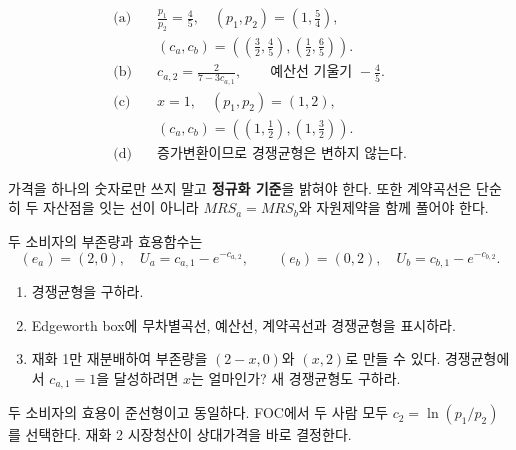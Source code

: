 \begin{answerbox}
\begin{align*}
\text{(a)}\quad &\frac{p_1}{p_2}=\frac45,\quad (p_1,p_2)=\left(1,\frac54\right),\\
&(c_a,c_b)=\left(\left(\frac32,\frac45\right),\left(\frac12,\frac65\right)\right).\\[2mm]
\text{(b)}\quad &c_{a,2}=\frac{2}{7-3c_{a,1}},\qquad \text{예산선 기울기 }-\frac45.\\[2mm]
\text{(c)}\quad &x=1,\quad (p_1,p_2)=(1,2),\\
&(c_a,c_b)=\left(\left(1,\frac12\right),\left(1,\frac32\right)\right).\\[2mm]
\text{(d)}\quad &\text{증가변환이므로 경쟁균형은 변하지 않는다.}
\end{align*}
\end{answerbox}

\begin{warningbox}
가격을 하나의 숫자로만 쓰지 말고 \textbf{정규화 기준}을 밝혀야 한다. 또한 계약곡선은 단순히 두 자산점을 잇는 선이 아니라 $MRS_a=MRS_b$와 자원제약을 함께 풀어야 한다.
\end{warningbox}

\begin{officialbox}
두 소비자의 부존량과 효용함수는
\[
(e_a)=(2,0),\quad U_a=c_{a,1}-e^{-c_{a,2}},
\qquad
(e_b)=(0,2),\quad U_b=c_{b,1}-e^{-c_{b,2}}.
\]
\begin{enumerate}[label=(\alph*)]
\item 경쟁균형을 구하라.
\item Edgeworth box에 무차별곡선, 예산선, 계약곡선과 경쟁균형을 표시하라.
\item 재화 1만 재분배하여 부존량을 $(2-x,0)$와 $(x,2)$로 만들 수 있다. 경쟁균형에서 $c_{a,1}=1$을 달성하려면 $x$는 얼마인가? 새 경쟁균형도 구하라.
\end{enumerate}
\end{officialbox}

\begin{strategybox}
두 소비자의 효용이 준선형이고 동일하다. FOC에서 두 사람 모두 $c_2=\ln(p_1/p_2)$를 선택한다. 재화 2 시장청산이 상대가격을 바로 결정한다.
\end{strategybox}

